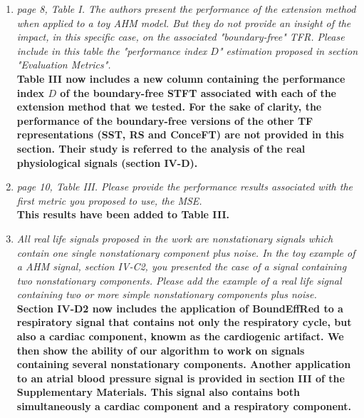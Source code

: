 \documentclass[11pt,DIV=16]{scrartcl}
\begin{document}
\begin{enumerate}[1)]
\item
\textit{page 8, Table I. The authors present the performance of the extension method when applied to a toy AHM model. But they do not provide an insight of the impact, in this specific case, on the associated "boundary-free" TFR. Please include in this table the "performance index $D$" estimation proposed in section "Evaluation Metrics".}\\
\textbf{Table III now includes a new column containing the performance index $D$ of the boundary-free STFT associated with each of the extension method that we tested. For the sake of clarity, the performance of the boundary-free versions of the other TF representations (SST, RS and ConceFT) are not provided in this section. Their study is referred to the analysis of the real physiological signals (section IV-D).}
\item
\textit{page 10, Table III. Please provide the performance results associated with the first metric you proposed to use, the MSE. }\\
\textbf{This results have been added to Table III.}
\item
\textit{All real life signals proposed in the work are nonstationary signals which contain one single nonstationary component plus noise. In the toy example of a  AHM signal, section IV-C2, you presented the case of a signal containing two nonstationary components. Please add the example of a real life signal containing two or more simple nonstationary components plus noise.}\\
\textbf{Section IV-D2 now includes the application of \textsf{BoundEffRed} to a respiratory signal that contains not only the respiratory cycle, but also a
cardiac component, knowm as the cardiogenic artifact. We then show the ability of our algorithm to work on signals containing several nonstationary components. Another application to an atrial blood pressure signal is provided in section III of the Supplementary Materials. This signal also contains both simultaneously a cardiac component and a respiratory component.}
\end{enumerate}
\end{document}
